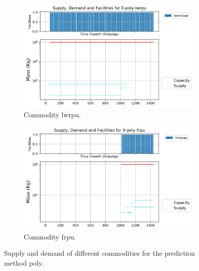 \documentclass[11pt]{article}
\begin{document}
\begin{figure}[]
	\centering
	\begin{subfigure}[t]{0.45\textwidth}
		\centering
		\includegraphics[width=\linewidth]{23-figures/0-poly-lwrpu.png} 
		\caption{Commodity lwrpu.}
		\label{fig:23-lwrpu}
	\end{subfigure}
	\vspace{1cm}
	\begin{subfigure}[t]{0.45\textwidth}
		\centering
		\includegraphics[width=\linewidth]{23-figures/0-poly-frpu.png} 
		\caption{Commodity frpu.}
		\label{fig:23-frpu}
	\end{subfigure}
	\hfill
	\caption{Supply and demand of different commodities for the prediction method poly.}
	\label{fig:23-pu}
\end{figure}
\end{document}
